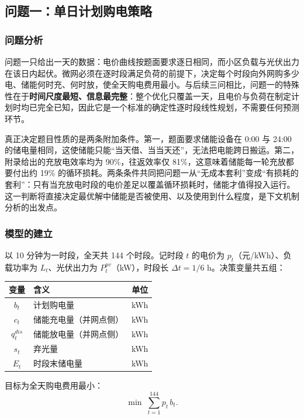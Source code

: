 \subsection{问题一：单日计划购电策略}

\subsubsection{问题分析}

问题一只给出一天的数据：电价曲线按题面要求逐日相同，而小区负载与光伏出力在该日内起伏。微网必须在逐时段满足负荷的前提下，决定每个时段向外网购多少电、储能何时充、何时放，使全天购电费用最小。与后续三问相比，问题一的特殊性在于\textbf{时间尺度最短、信息最完整}：整个优化只覆盖一天，且电价与负荷在制定计划时均已完全已知，因此它是一个标准的确定性逐时段线性规划，不需要任何预测环节。

真正决定题目性质的是两条附加条件。第一，题面要求储能设备在 0:00 与 24:00 的储电量相同，这使储能只能“当天借、当当天还”，无法把电能跨日搬运。第二，附录给出的充放电效率均为 90\%，往返效率仅 81\%，这意味着储能每一轮充放都要付出约 19\% 的循环损耗。两条条件共同把问题一从“无成本套利”变成“有损耗的套利”：只有当充放电时段的电价差足以覆盖循环损耗时，储能才值得投入运行。这一判断将直接决定最优解中储能是否被使用、以及使用到什么程度，是下文机制分析的出发点。

\subsubsection{模型的建立}

以 10 分钟为一时段，全天共 144 个时段。记时段 $t$ 的电价为 $p_t$（元/kWh）、负载功率为 $L_t$、光伏出力为 $P^{pv}_t$（kW），时段长 $\Delta t=1/6$ h。决策变量共五组：

\begin{center}
\small
\begin{tabular}{clc}
\toprule
变量 & 含义 & 单位 \\
\midrule
$b_t$ & 计划购电量 & kWh \\
$c_t$ & 储能充电量（并网点侧） & kWh \\
$q^{dis}_t$ & 储能放电量（并网点侧） & kWh \\
$s_t$ & 弃光量 & kWh \\
$E_t$ & 时段末储电量 & kWh \\
\bottomrule
\end{tabular}
\end{center}

目标为全天购电费用最小：
\begin{equation*}
\min\;\sum_{t=1}^{144} p_t\,b_t .
\end{equation*}

